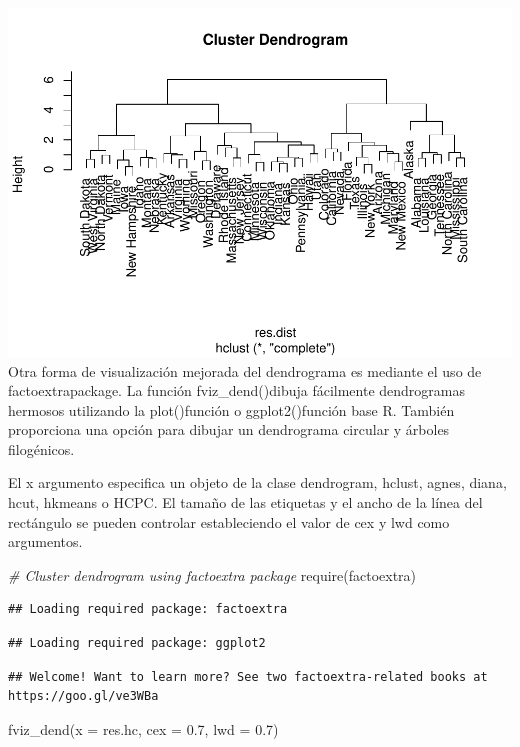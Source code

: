 \documentclass[
]{article}
\newenvironment{Shaded}{\begin{snugshade}}{\end{snugshade}}
\newcommand{\AttributeTok}[1]{\textcolor[rgb]{0.77,0.63,0.00}{#1}}
\newcommand{\CommentTok}[1]{\textcolor[rgb]{0.56,0.35,0.01}{\textit{#1}}}
\newcommand{\FloatTok}[1]{\textcolor[rgb]{0.00,0.00,0.81}{#1}}
\newcommand{\FunctionTok}[1]{\textcolor[rgb]{0.00,0.00,0.00}{#1}}
\newcommand{\NormalTok}[1]{#1}
\begin{document}
\includegraphics{clusterjerarquico1_files/figure-latex/unnamed-chunk-6-1.pdf}
Otra forma de visualización mejorada del dendrograma es mediante el uso
de factoextrapackage. La función fviz\_dend()dibuja fácilmente
dendrogramas hermosos utilizando la plot()función o ggplot2()función
base R. También proporciona una opción para dibujar un dendrograma
circular y árboles filogénicos.

El x argumento especifica un objeto de la clase dendrogram, hclust,
agnes, diana, hcut, hkmeans o HCPC. El tamaño de las etiquetas y el
ancho de la línea del rectángulo se pueden controlar estableciendo el
valor de cex y lwd como argumentos.

\begin{Shaded}
\begin{Highlighting}[]
\CommentTok{\# Cluster dendrogram using factoextra package}
\FunctionTok{require}\NormalTok{(factoextra)}
\end{Highlighting}
\end{Shaded}

\begin{verbatim}
## Loading required package: factoextra
\end{verbatim}

\begin{verbatim}
## Loading required package: ggplot2
\end{verbatim}

\begin{verbatim}
## Welcome! Want to learn more? See two factoextra-related books at https://goo.gl/ve3WBa
\end{verbatim}

\begin{Shaded}
\begin{Highlighting}[]
\FunctionTok{fviz\_dend}\NormalTok{(}\AttributeTok{x =}\NormalTok{ res.hc, }\AttributeTok{cex =} \FloatTok{0.7}\NormalTok{, }\AttributeTok{lwd =} \FloatTok{0.7}\NormalTok{) }
\end{Highlighting}
\end{Shaded}
\end{document}
